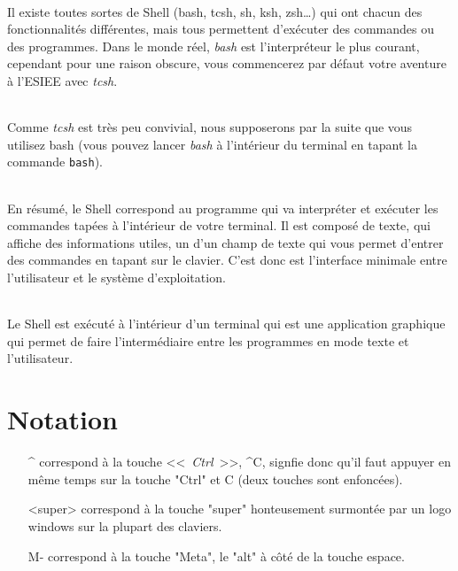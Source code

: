 \documentclass[french, a4paper, 12pt, titlepage]{article}
\begin{document}
\paragraph{} Il existe toutes sortes de Shell (bash, tcsh, sh, ksh, zsh\dots)
qui ont chacun des fonctionnalités différentes, mais tous permettent d'exécuter
des commandes ou des programmes. Dans le monde réel, \emph{bash} est
l'interpréteur le plus courant, cependant pour une raison obscure, vous
commencerez par défaut votre aventure à l'ESIEE avec \emph{tcsh}.

\paragraph{} Comme \emph{tcsh} est très peu convivial, nous supposerons par la
suite que vous utilisez bash (vous pouvez lancer \emph{bash} à l'intérieur du
terminal en tapant la commande \texttt{bash}).

\paragraph{} En résumé, le Shell correspond au programme qui va interpréter et
exécuter les commandes tapées à l'intérieur de votre terminal. Il est composé
de texte, qui affiche des informations utiles, un d'un champ de texte qui vous
permet d'entrer des commandes en tapant sur le clavier. C'est donc est
l'interface minimale entre l'utilisateur et le système d'exploitation.

\paragraph{} Le Shell est exécuté à l'intérieur d'un terminal qui est une
application graphique qui permet de faire l'intermédiaire entre les programmes
en mode texte et l'utilisateur.

\part{Notation}

\begin{enumerate}
	\item[\^{}] correspond à la touche <<~\emph{Ctrl}~>>, \^{}C, signfie donc
		qu'il faut appuyer en même temps sur la touche "Ctrl" et C (deux
		touches sont enfoncées).
	\item [<super>] correspond à la touche "super" honteusement surmontée par
		un logo windows sur la plupart des claviers.
	\item [M-] correspond à la touche "Meta", le "alt" à côté de la touche
		espace.
\end{enumerate}
\end{document}

